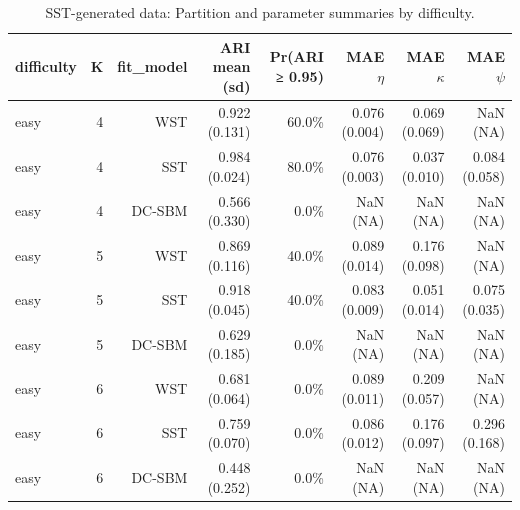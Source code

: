 \begin{table}[!h]
\centering
\caption{SST-generated data: Partition and parameter summaries by difficulty.\\\label{tab:sst-appx-diff-partition}}
\centering
\begin{tabular}[t]{lrrrrrrr}
\toprule
difficulty & K & fit_model & ARI mean (sd) & Pr(ARI ≥ 0.95) & MAE $\eta$ & MAE $\kappa$ & MAE $\psi$\\
\midrule
easy & 4 & WST & 0.922 (0.131) & 60.0\% & 0.076 (0.004) & 0.069 (0.069) & NaN (NA)\\
easy & 4 & SST & 0.984 (0.024) & 80.0\% & 0.076 (0.003) & 0.037 (0.010) & 0.084 (0.058)\\
easy & 4 & DC-SBM & 0.566 (0.330) & 0.0\% & NaN (NA) & NaN (NA) & NaN (NA)\\
easy & 5 & WST & 0.869 (0.116) & 40.0\% & 0.089 (0.014) & 0.176 (0.098) & NaN (NA)\\
easy & 5 & SST & 0.918 (0.045) & 40.0\% & 0.083 (0.009) & 0.051 (0.014) & 0.075 (0.035)\\
easy & 5 & DC-SBM & 0.629 (0.185) & 0.0\% & NaN (NA) & NaN (NA) & NaN (NA)\\
easy & 6 & WST & 0.681 (0.064) & 0.0\% & 0.089 (0.011) & 0.209 (0.057) & NaN (NA)\\
easy & 6 & SST & 0.759 (0.070) & 0.0\% & 0.086 (0.012) & 0.176 (0.097) & 0.296 (0.168)\\
easy & 6 & DC-SBM & 0.448 (0.252) & 0.0\% & NaN (NA) & NaN (NA) & NaN (NA)\\
\bottomrule
\end{tabular}
\end{table}
